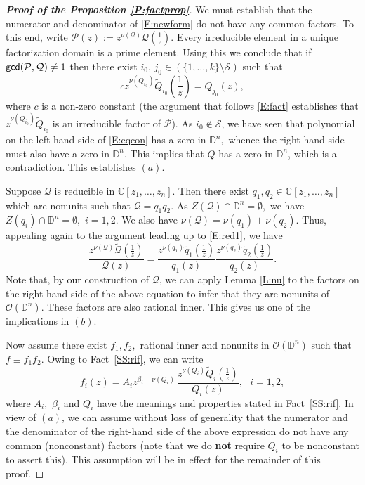\documentclass[11pt, reqno]{amsart}
\numberwithin{equation}{section}
\theoremstyle{definition}
\theoremstyle{remark}
\theoremstyle{plain}
\begin{document}
\begin{proof}[{\bf Proof of the Proposition \ref{P:factprop}}]
We must establish that the numerator and denominator of \eqref{E:newform} do not have any
common factors. To this end, 
write $\mathcal{P}(z):=z^{\nu({\mathcal{Q}})}\widetilde{\mathcal{Q}}(\frac{1}{z}).$  
Every irreducible element in a unique factorization domain is a prime element.
Using this we conclude that if
${{\sf gcd}}(\mathcal{P},{\mathcal{Q}})\not =1$ then there exist $i_0,\,j_0\in (\{1,\dots, k\}\!\setminus\!\mathcal{S})$ such
that 
\begin{equation}
cz^{\nu(Q_{i_0})}\widetilde{Q}_{i_0}\left(\frac{1}{z}\right)=Q_{j_0}(z),\label{E:eqcon}
\end{equation}
where $c$ is a non-zero constant (the argument that follows \eqref{E:fact} establishes that
$z^{\nu(Q_{i_0})}\widetilde{Q}_{i_0}$ is an irreducible factor of $\mathcal{P}$). 
As $i_0\notin \mathcal{S}$, we have seen that
polynomial on the left-hand side  of \eqref{E:eqcon} has a zero in ${\mathbb{D}}^n,$
whence the right-hand side must also have a zero 
in ${\mathbb{D}}^n.$ This implies that $Q$ has a zero in ${\mathbb{D}}^n$, which is a contradiction.
This establishes $(a)$.
\smallskip

Suppose ${\mathcal{Q}}$ is reducible in ${\mathbb{C}}[z_1,\ldots, z_n].$ Then there exist $q_1, q_2\in
{\mathbb{C}}[z_1,\ldots, z_n]$ which are nonunits such that ${\mathcal{Q}}=q_1q_2.$ As $Z({\mathcal{Q}})\cap{\mathbb{D}}^n=\emptyset,$
we have $Z(q_i)\cap{\mathbb{D}}^n=\emptyset,\,\,i=1,2.$ We also have $\nu({\mathcal{Q}})=\nu(q_1)+\nu(q_2).$ Thus,
appealing again to the argument leading up to \eqref{E:red1}, we have
\[
\frac{z^{\nu({\mathcal{Q}})}\widetilde{\mathcal{Q}}(\frac{1}{z})}{{\mathcal{Q}}(z)}=\frac{z^{\nu(q_1)}\widetilde{q}_1(\frac{1}{z})}{q_1(z)}
\frac{z^{\nu(q_2)}\widetilde{q}_2(\frac{1}{z})}{q_2(z)}.
\]
Note that, by our construction of ${\mathcal{Q}}$, we can apply
Lemma \ref{L:nu} to the factors on the right-hand side of the above equation to infer that they are nonunits
of ${\mathcal{O}}({\mathbb{D}}^n)$. These factors are also rational inner. This gives us one of the implications in $(b)$.
\smallskip

Now assume there exist $f_1,f_2,$ rational inner and nonunits in ${\mathcal{O}}({\mathbb{D}}^n)$
such that $f\equiv f_1f_2.$ Owing to Fact~\ref{SS:rif}, we can write
\[
f_i(z) = A_i z^{\beta_i-\nu(Q_i)}\,\frac{z^{\nu(Q_i)}\widetilde{Q}_i(\frac{1}{z})}{Q_i(z)}, \ \ \ 
i=1, 2,
\]
where $A_i,$ $\beta_i$ and $Q_i$ have the meanings and properties
stated in Fact~\ref{SS:rif}. In view of $(a)$, we can assume without loss of generality that
the numerator and the denominator of the right-hand side of the above expression do not
have any common (nonconstant) factors (note that we do {\bf not} require $Q_i$ to be
nonconstant to assert this). This assumption will be in effect for the remainder of this proof.
\smallskip


\end{proof}
\end{document}
